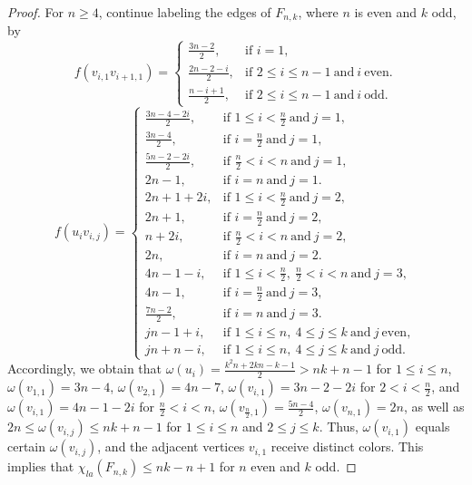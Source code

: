 \documentclass[12pt]{article}
\begin{document}
\begin{proof}
For $n\geq 4$, continue labeling the edges of $F_{n,k}$, where $n$ is even and $k$ odd, by
\begin{equation*}
f(v_{i,1}v_{i+1,1})=\left\{\begin{array}{ll}
{\frac{3n-2}{2}},  &\text{if }i=1,\\[3pt]
{\frac{2n-2-i}{2}}, &\text{if }2\leq i\leq n-1~\text{and}~i~\text{even}.\\[3pt]
{\frac{n-i+1}{2}}, &\text{if }2\leq i\leq n-1~\text{and}~i~\text{odd}.
\end{array}\right.
\end{equation*}
\begin{equation*}
f(u_{i}v_{i,j})=\left\{\begin{array}{ll}
{\frac{3n-4-2i}{2}}, &\text{if }1\leq i<\frac{n}{2}~\text{and}~j=1,\\[3pt]
{\frac{3n-4}{2}},   &\text{if }i=\frac{n}{2}~\text{and}~j=1,\\[3pt]
{\frac{5n-2-2i}{2}}, &\text{if }\frac{n}{2}<i<n~\text{and}~j=1,\\[3pt]
2n-1, &\text{if }i=n~\text{and}~j=1.\\
2n+1+2i, &\text{if }1\leq i<\frac{n}{2}~\text{and}~j=2,\\
2n+1,    &\text{if }i=\frac{n}{2}~\text{and}~j=2,\\
n+2i,    &\text{if }\frac{n}{2}<i<n~\text{and}~j=2,\\
2n,      &\text{if }i=n~\text{and}~j=2.\\
4n-1-i, &\text{if }1\leq i<\frac{n}{2},~\frac{n}{2}<i<n~\text{and}~j=3,\\
4n-1,    &\text{if }i=\frac{n}{2}~\text{and}~j=3,\\[1pt]
\frac{7n-2}{2},      &\text{if }i=n~\text{and}~j=3.\\[1pt]
jn-1+i, &\text{if }1\leq i\leq n,~4\leq j\leq k~\text{and}~j~\text{even},\\
jn+n-i, &\text{if }1\leq i\leq n,~4\leq j\leq k~\text{and}~j~\text{odd}.
\end{array}\right.
\end{equation*}
Accordingly, we obtain that $\omega(u_{i})=\frac{k^{2}n+2kn-k-1}{2}>nk+n-1$ for $1\leq i\leq n$,  $\omega(v_{1,1})=3n-4$, $\omega(v_{2,1})=4n-7$, $\omega(v_{i,1})=3n-2-2i$ for $2<i<\frac{n}{2}$, and $\omega(v_{i,1})=4n-1-2i$ for $\frac{n}{2}<i<n$, $\omega(v_{\frac{n}{2},1})=\frac{5n-4}{2}$,
$\omega(v_{n,1})=2n$, as well as $2n\leq \omega(v_{i,j})\leq nk+n-1$ for $1\leq i\leq n$ and $2\leq j\leq k$.
Thus, $\omega(v_{i,1})$ equals certain $\omega(v_{i,j})$, and the adjacent vertices $v_{i,1}$ receive distinct colors. This implies that $\chi_{la}(F_{n,k})\leq nk-n+1$ for $n$ even and $k$ odd.

\end{proof}
\end{document}
